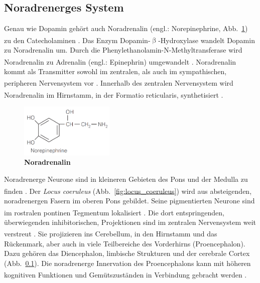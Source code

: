 \documentclass[12pt,a4paper,pdftex]{article}
\begin{document}
\subsection{Noradrenerges System}
\label{noradrenerges_system}
Genau wie Dopamin gehört auch Noradrenalin (engl.: Norepinephrine, Abb.~\ref{fig:noradrenalin}) zu den Catecholaminen \textsuperscript{\cite[1]{trepel2011neuroanatomie}}. Das Enzym Dopamin-$\upbeta$-Hydroxylase wandelt Dopamin zu Noradrenalin um. Durch die Phenylethanolamin-N-Methyltransferase wird Noradrenalin zu Adrenalin (engl.: Epinephrin) umgewandelt \textsuperscript{\cite[13]{kandel2013principles}}. Noradrenalin kommt als Transmitter sowohl im zentralen, als auch im sympathischen, peripheren Nervensystem vor \textsuperscript{\cite[4]{crossman2014neuroanatomy}}. Innerhalb des zentralen Nervensystem wird Noradrenalin im Hirnstamm, in der Formatio reticularis, synthetisiert \textsuperscript{\cite[7]{trepel2011neuroanatomie}}.

\begin{figure}[H]
    \centering
    \includegraphics[width=0.4\textwidth]{pictures/Bilder_monoamine_systeme/noradrenalin.PNG}
    \caption{\textbf{Noradrenalin}}
    \label{fig:noradrenalin}
\end{figure}

Noradrenerge Neurone sind in kleineren Gebieten des Pons und der Medulla zu finden \textsuperscript{\cite[24]{kandel2013principles}}. Der \textit{Locus coeruleus} (Abb.~\ref{fig:locus_coeruleus}) wird aus absteigenden, noradrenergen Fasern im oberen Pons gebildet. Seine pigmentierten Neurone sind im rostralen pontinen Tegmentum lokalisiert \textsuperscript{\cite[8]{crossman2014neuroanatomy}}. Die dort entspringenden, überwiegenden inhibitorischen, Projektionen sind im zentralen Nervensystem weit verstreut \textsuperscript{\cite[6]{trepel2011neuroanatomie}}. Sie projizieren ins Cerebellum, in den Hirnstamm und das Rückenmark, aber auch in viele Teilbereiche des Vorderhirns (Proencephalon). Dazu gehören das Diencephalon, limbische Strukturen und der cerebrale Cortex (Abb.~\ref{noradrenerges_system}). Die noradrenerge Innervation des Proencephalons kann mit höheren kognitiven Funktionen und Gemütszuständen in Verbindung gebracht werden \textsuperscript{\cite[8]{crossman2014neuroanatomy}}.
\end{document}
